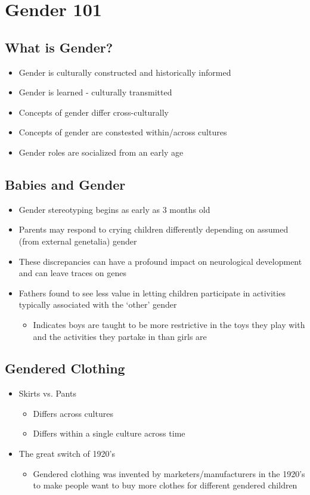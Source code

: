 \documentclass{article}
\begin{document}
\section{Gender 101} %

\subsection{What is Gender?}
\begin{itemize}
  \item Gender is culturally constructed and historically informed
  \item Gender is learned - culturally transmitted
  \item Concepts of gender differ cross-culturally
  \item Concepts of gender are constested within/across cultures
  \item Gender roles are socialized from an early age
\end{itemize}

\subsection{Babies and Gender}
\begin{itemize}
  \item Gender stereotyping begins as early as 3 months old
  \item Parents may respond to crying children differently depending on assumed (from external genetalia) gender
  \item These discrepancies can have a profound impact on neurological development and can leave traces on genes
  \item Fathers found to see less value in letting children participate in activities typically associated with the `other' gender \begin{itemize}
    \item Indicates boys are taught to be more restrictive in the toys they play with and the activities they partake in than girls are
  \end{itemize}
\end{itemize}

\subsection{Gendered Clothing}
\begin{itemize}
  \item Skirts vs. Pants \begin{itemize}
    \item Differs across cultures
    \item Differs within a single culture across time
  \end{itemize}
  \item The great switch of 1920's \begin{itemize}
    \item Gendered clothing was invented by marketers/manufacturers in the 1920's to make people want to buy more clothes for different gendered children
  \end{itemize}
\end{itemize}
\end{document}
